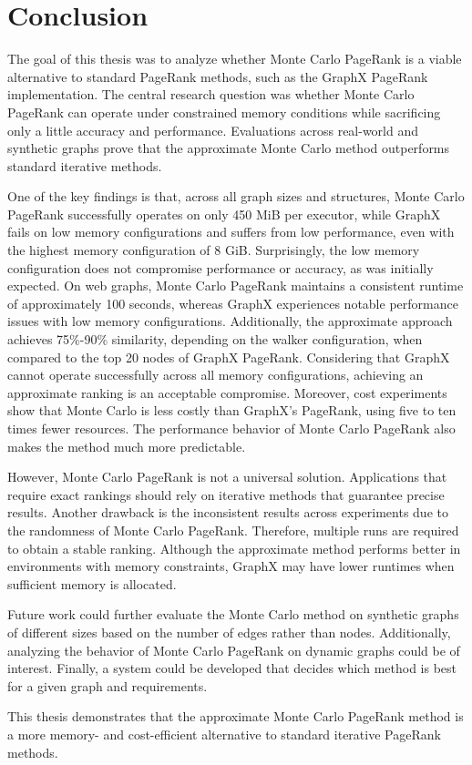 \section{Conclusion}


The goal of this thesis was to analyze whether Monte Carlo PageRank is a viable alternative to standard PageRank methods, such as the GraphX PageRank implementation. The central research question was whether Monte Carlo PageRank can operate under constrained memory conditions while sacrificing only a little accuracy and performance. Evaluations across real-world and synthetic graphs prove that the approximate Monte Carlo method outperforms standard iterative methods.\par

One of the key findings is that, across all graph sizes and structures, Monte Carlo PageRank successfully operates on only 450 MiB per executor, while GraphX fails on low memory configurations and suffers from low performance, even with the highest memory configuration of 8 GiB. Surprisingly, the low memory configuration does not compromise performance or accuracy, as was initially expected. On web graphs, Monte Carlo PageRank maintains a consistent runtime of approximately 100 seconds, whereas GraphX experiences notable performance issues with low memory configurations. Additionally, the approximate approach achieves 75\%-90\% similarity, depending on the walker configuration, when compared to the top 20 nodes of GraphX PageRank. Considering that GraphX cannot operate successfully across all memory configurations, achieving an approximate ranking is an acceptable compromise. Moreover, cost experiments show that Monte Carlo is less costly than GraphX's PageRank, using five to ten times fewer resources. The performance behavior of Monte Carlo PageRank also makes the method much more predictable.\par

However, Monte Carlo PageRank is not a universal solution. Applications that require exact rankings should rely on iterative methods that guarantee precise results. Another drawback is the inconsistent results across experiments due to the randomness of Monte Carlo PageRank. Therefore, multiple runs are required to obtain a stable ranking. Although the approximate method performs better in environments with memory constraints, GraphX may have lower runtimes when sufficient memory is allocated.\par

Future work could further evaluate the Monte Carlo method on synthetic graphs of different sizes based on the number of edges rather than nodes. Additionally, analyzing the behavior of Monte Carlo PageRank on dynamic graphs could be of interest. Finally, a system could be developed that decides which method is best for a given graph and requirements. \par

This thesis demonstrates that the approximate Monte Carlo PageRank method is a more memory- and cost-efficient alternative to standard iterative PageRank methods. 